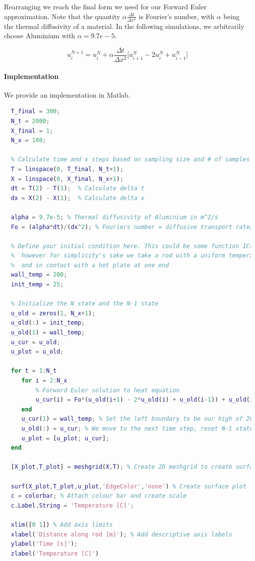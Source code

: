 \noindent Rearranging we reach the final form we need for our Forward Euler approximation. Note that the quantity $\alpha\frac{\Delta t}{\Delta x^2}$ is Fourier's number, with $\alpha$ being the thermal diffusivity of a material. In the following simulations, we arbitrarily choose Aluminium with $\alpha = 9.7e-5$.

\begin{equation}
u_{i}^{N+1}=u_{i}^{N}+\alpha\frac{\Delta t}{\Delta x^2}\big[ {u_{i+1}^{N}-2u_{i}^{N}+u_{i-1}^{N}}\big]
\end{equation}

\paragraph{Implementation}
We provide an implementation in Matlab. 

\begin{lstlisting}[language=Matlab, caption=Forward Euler and Plotting in MATLAB]
  % Values arbitrarily chosen. It's a useful exercise to vary these and look at the results
  T_final = 300;
  N_t = 2000;
  X_final = 1;
  N_x = 100;
  
  % Calculate time and x steps based on sampling size and # of samples
  T = linspace(0, T_final, N_t+1);
  X = linspace(0, X_final, N_x+1);
  dt = T(2) - T(1);  % Calculate delta t
  dx = X(2) - X(1);  % Calculate delta x

  alpha = 9.7e-5; % Thermal diffusivity of Aluminium in m^2/s
  Fo = (alpha*dt)/(dx^2); % Fouriers number = diffusive transport rate/storage rate
 
  % Define your initial condition here. This could be some function IC(x),
  %  however for simplicity's sake we take a rod with a uniform temperature
  %  and in contact with a hot plate at one end
  wall_temp = 200;
  init_temp = 25;
  
  % Initialize the N state and the N-1 state
  u_old = zeros(1, N_x+1); 
  u_old(:) = init_temp;
  u_old(1) = wall_temp;
  u_cur = u_old;
  u_plot = u_old;

  for t = 1:N_t
     for i = 2:N_x
     	 % Forward Euler solution to heat equation
         u_cur(i) = Fo*(u_old(i+1) - 2*u_old(i) + u_old(i-1)) + u_old(i);
     end
     u_cur(1) = wall_temp; % Set the left boundary to be our high of 200 
     u_old(:) = u_cur; % We move to the next time step, reset N-1 state
     u_plot = [u_plot; u_cur];
  end

  [X_plot,T_plot] = meshgrid(X,T); % Create 2D meshgrid to create surface plot

  surf(X_plot,T_plot,u_plot,'EdgeColor','none') % Create surface plot
  c = colorbar; % Attach colour bar and create scale
  c.Label.String = 'Temperature [C]';

  xlim([0 1]) % Add axis limits
  xlabel('Distance along rod [m]'); % Add descriptive axis labels
  ylabel('Time [s]');
  zlabel('Temperature [C]')

\end{lstlisting}


